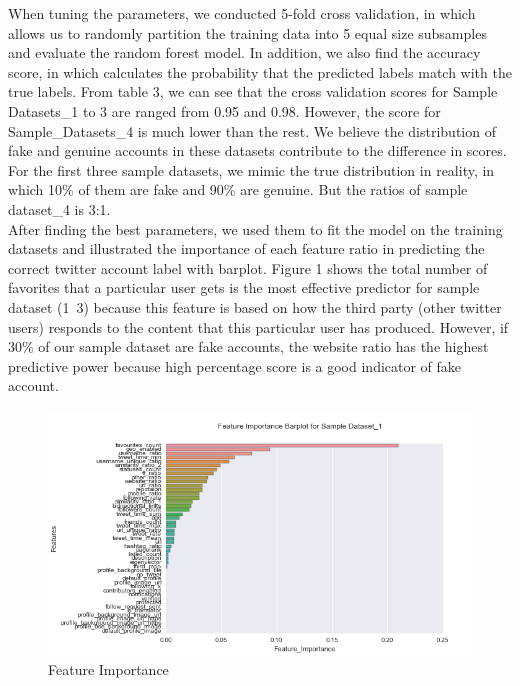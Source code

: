 \documentclass[a4paper, twoside, 12pt]{report}
\begin{document}
\noindent When tuning the parameters, we conducted 5-fold cross validation, in which allows us to randomly partition the training data into 5 equal size subsamples and evaluate the random forest model. In addition, we also find the accuracy score, in which calculates the probability that the predicted labels match with the true labels. From table 3, we can see that the cross validation scores for Sample Datasets\_1 to 3 are ranged from 0.95 and 0.98. However, the score for Sample\_Datasets\_4 is much lower than the rest. We believe the distribution of fake and genuine accounts in these datasets contribute to the difference in scores. For the first three sample datasets, we mimic the true distribution in reality, in which 10\% of them are fake and 90\% are genuine. But the ratios of sample dataset\_4 is 3:1. \\

\noindent After finding the best parameters, we used them to fit the model on the training datasets and illustrated the importance of each feature ratio in predicting the correct twitter account label with barplot. Figure 1 shows the total number of favorites that a particular user gets is the most effective predictor for sample dataset (1~3) because this feature is based on how the third party (other twitter users) responds to the content that this particular user has produced. However, if 30\% of our sample dataset are fake accounts, the website ratio has the highest predictive power because high percentage score is a good indicator of fake account.  \\

\begin{figure}[H]
	\centering
	\includegraphics[scale=0.7]{feature_1}
	\caption{Feature Importance}
	\label{fig:mesh1}
\end{figure}
\end{document}
